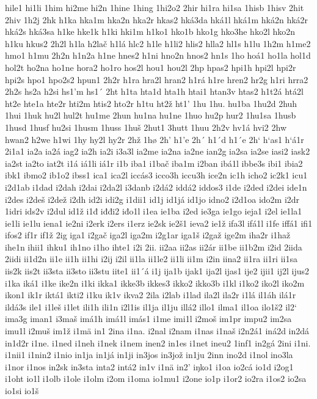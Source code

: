 hile1
hi1li
1him
hi2me
hi2n
1hine
1hing
1hi2o2
2hir
hi1ra
hi1sa
1hisb
1hisv
2hit
2hiv
1h2j
2hk
h1ka
hka1m
hka2n
hka2r
hkas2
hká3da
hká1l
hká1m
hká2n
hká2r
hká2s
hká3sa
h1ke
hke1k
h1ki
hki1m
h1ko1
hko1b
hko1g
hko3he
hko2l
hko2n
h1ku
hkus2
2h2l
h1la
h2lač
h1lá
hlc2
h1le
h1li2
hlis2
hlla2
hl1s
h1lu
1h2m
h1me2
hmo1
h1mu
2h2n
h1n2a
h1ne
hnes2
h1ni
hno2n
hnos2
hn1s
1ho
hoá1
ho1la
hol1d
hol2t
ho2na
ho1ne
hora2
ho1ro
hos2l
hou1
hou2l
2hp
hpas2
hpi1h
hpi2l
hpi2r
hpi2s
hpo1
hpo2s2
hpun1
2h2r
h1ra
hra2l
hran2
h1rá
h1re
hren2
hr2g
h1ri
hrra2
2h2s
hs2a
h2si
hs1'm
hs1´
2ht
h1ta
hta1d
hta1h
htai1
htan3v
htas2
h1t2á
htá2l
ht2e
hte1a
hte2r
hti2m
htis2
hto2r
h1tu
ht2ž
ht1'
1hu
1hu.
hu1ba
1hu2d
2huh
1hui
1huk
hu2l
hul2t
hu1me
2hun
hu1na
hu1ne
1huo
hu2p
hur2
1hu1sa
1husb
1husd
1husf
hu2si
1husm
1huss
1huš
2hut1
3hutt
1huu
2h2v
hv1á
hvi2
2hw
hwan2
h2we
h1wi
1hy
hy2l
hy2r
2hž
1hø
2h'
h1'e
2h´
h1´d
h1´e
2h`
h`as1
h`á1r
2i1a1
ia2a
ia2á
iag2
ia2h
ia2i
i3a3l
ia2me
ia2na
ia2ne
ian2g
ia2sa
ia2se
iasi2
iask2
ia2st
ia2to
iat2t
i1á
iá1li
iá1r
i1b
iba1
i1bač
iba1m
i2ban
ibá1l
ibbe3s
ibi1
ibia2
ibk1
ibmo2
ib1o2
ibss1
ica1
ica2l
iccás3
icco3h
iccu3h
ice2n
ic1h
icho2
ic2k1
icu1
i2d1ab
i1dad
i2dah
i2dai
i2da2l
i3danb
i2dá2
iddá2
iddos3
i1de
i2ded
i2dei
ide1n
i2des
i2deš
i2dež
i2dh
id2i
idi2g
i1dii1
id1j
id1já
id1jo
idno2
i2d1oa
ido2m
i2dr
1idri
ids2v
i2dul
id1ž
i1đ
iđđi2
iđo1l
i1ea
ie1ba
i2ed
ie3ga
ie1go
ieja1
i2el
ie1la1
ie1li
ie1lu
iena1
ie2ni
i2erk
i2ers
i1erz
ie2sk
ie2š1
ieva2
ie1ž
ifa3l
ifá1l
i1fe
iffá1
ifi1
ifos2
if1r
if1ž
2ig
iga1
i2gač
iga2l
iga2m
i2g1ar
iga1š
i2gaž
ige2m
iha2r
i1haž
ihe1n
ihii1
ihku1
ih1no
i1ho
ihte1
i2i
2ii.
ii2aa
ii2as
ii2ár
ii1be
ii1b2m
i2id
2iida
2iidi
ii1d2n
ii1e
ii1h
ii1hi
i2ij
i2il
ii1la
ii1le2
ii1li
ii1m
i2in
iina2
ii1ra
ii1ri
ii1sa
iis2k
iis2t
ii3sta
ii3sto
ii3stu
iite1
ii1´á
i1j
ija1b
ijak1
ija2l
ijas1
ije2
ijii1
ij2l
ijus2
i1ka
iká1
i1ke
ike2n
i1ki
ikka1
ikke3b
ikkes3
ikko2
ikko3b
i1kl
i1ko2
iko2l
iko2m
ikon1
ik1r
iktá1
ikti2
i1ku
ik1v
ikva2
2ila
i2lab
i1lad
ila2l
ila2r
i1lá
il1áh
ilá1r
ildá3s
ile1
i1leš
i1let
ili1h
ili1n
i2l1is
il1ja
il1ju
illá2
illo1
ilma1
il1oa
ilo1š2
il2`
ima3g
iman1
i3maš
imá1h
imá1l
imás1
i1me
imi1l
i2moš
im1pr
impu2
im2sa
imu1l
i2muš
im1ž
i1mä
in1
2ina
i1na.
i2nal
i2nam
i1nas
i1naš
i2n2á1
iná2d
in2dá
in1d2r
i1ne.
i1ned
i1neh
i1nek
i1nem
inen2
in1es
i1net
ineu2
1inf1
in2gá
2ini
i1ni.
i1nii1
i1nin2
i1nio
in1ja
in1já
in1ji
in3jos
in3jož
in1ju
2inn
ino2d
i1nol
ino3la
i1nor
i1nos
in2sk
in3sta
inta2
intá2
in1v
i1nä
in2'
iŋko1
i1oa
io2cá
io1d
i2og1
i1oht
io1l
i1olb
i1ole
i1olm
i2om
i1oma
io1mu1
i2one
io1p
i1or2
io2ra
i1os2
io2sa
io1si
io1š
